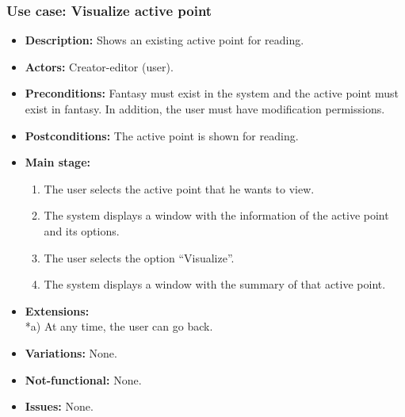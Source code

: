 \subsubsection{Use case: Visualize active point}
\begin{itemize}
	\item \textbf{Description:} Shows an existing active point for reading.
	\item \textbf{Actors:} Creator-editor (user).
	\item \textbf{Preconditions:} Fantasy must exist in the system and the active point must exist in fantasy. In addition, the user must have modification permissions.
	\item \textbf{Postconditions:} The active point is shown for reading.
	\item \textbf{Main stage:}
	\begin{enumerate}
		\item The user selects the active point that he wants to view.
		\item The system displays a window with the information of the active point and its options.
		\item The user selects the option ``Visualize''.
		\item The system displays a window with the summary of that active point.
	\end{enumerate}
	\item \textbf{Extensions:} \\ *a) At any time, the user can go back.
	\item \textbf{Variations:} None.
	\item \textbf{Not-functional:} None.
	\item \textbf{Issues:} None.
\end{itemize}

